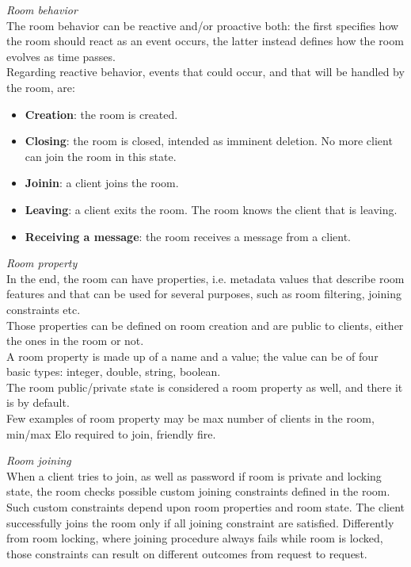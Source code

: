 \bigskip
\textit{Room behavior}
\\
The room behavior can be reactive and/or proactive both: the first specifies how the room should react as an event occurs, the latter instead defines how the room evolves as time passes.
\\
Regarding reactive behavior, events that could occur, and that will be handled by the room, are:
\begin{itemize}
\item \textbf{Creation}: the room is created.
\item \textbf{Closing}: the room is closed, intended as imminent deletion. No more client can join the room in this state. 
\item \textbf{Joinin}: a client joins the room.
\item \textbf{Leaving}: a client exits the room. The room knows the client that is leaving.
\item \textbf{Receiving a message}: the room receives a message from a client.
\end{itemize} 

\bigskip
\textit{Room property}
\\  
In the end, the room can have properties, i.e. metadata values that describe room features and that can be used for several purposes, such as room filtering, joining constraints etc.
\\
Those properties can be defined on room creation and are public to clients, either the ones in the room or not.
\\
A room property is made up of a name and a value; the value can be of four basic types: integer, double, string, boolean. 
\\
The room public/private state is considered a room property as well, and there it is by default.
\\
Few examples of room property may be max number of clients in the room, min/max Elo required to join, friendly fire.

\bigskip
\textit{Room joining}
\\
When a client tries to join, as well as password if room is private and locking state, the room checks possible custom joining constraints defined in the room. Such custom constraints depend upon room properties and room state. The client successfully joins the room only if all joining constraint are satisfied. Differently from room locking, where joining procedure always fails while room is locked, those constraints can result on different outcomes from request to request. 

